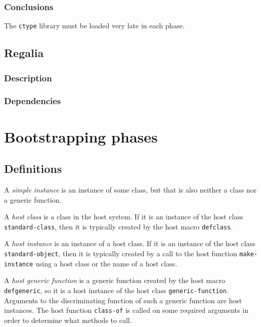 \subsubsection{Conclusions}

The \texttt{ctype} library must be loaded very late in each phase.

\subsection{Regalia}
\label{sec-regalia}

\subsubsection{Description}

\subsubsection{Dependencies}

\section{Bootstrapping phases}

\subsection{Definitions}

\begin{definition}
A \emph{simple instance} is an instance of some class, but that is
also neither a class nor a generic function.
\end{definition}

\begin{definition}
A \emph{host class} is a class in the host system.  If it is an
instance of the host class \texttt{standard-class}, then it is
typically created by the host macro \texttt{defclass}.
\end{definition}

\begin{definition}
A \emph{host instance} is an instance of a host class.  If it is an
instance of the host class \texttt{standard-object}, then it is
typically created by a call to the host function
\texttt{make-instance} using a host class or the name of a host class.
\end{definition}

\begin{definition}
A \emph{host generic function} is a generic function created by the
host macro \texttt{defgeneric}, so it is a host instance of the host
class \texttt{generic-function}.  Arguments to the discriminating
function of such a generic function are host instances.  The host
function \texttt{class-of} is called on some required arguments in
order to determine what methods to call.
\end{definition}

